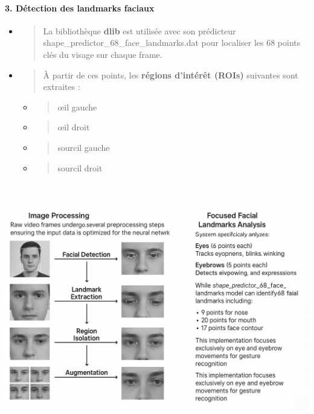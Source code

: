 \documentclass[
]{article}
\begin{document}
\hypertarget{duxe9tection-des-landmarks-faciaux}{%
\paragraph{\texorpdfstring{\textbf{3. Détection des landmarks faciaux}}{3. Détection des landmarks faciaux}}\label{duxe9tection-des-landmarks-faciaux}}

\begin{itemize}
\item
  \begin{quote}
  La bibliothèque \textbf{dlib} est utilisée avec son prédicteur shape\_predictor\_68\_face\_landmarks.dat pour localiser les 68 points clés du visage sur chaque frame.
  \end{quote}
\item
  \begin{quote}
  À partir de ces points, les \textbf{régions d'intérêt (ROIs)} suivantes sont extraites :
  \end{quote}

  \begin{itemize}
  \item
    \begin{quote}
    œil gauche
    \end{quote}
  \item
    \begin{quote}
    œil droit
    \end{quote}
  \item
    \begin{quote}
    sourcil gauche
    \end{quote}
  \item
    \begin{quote}
    sourcil droit
    \end{quote}
  \end{itemize}
\end{itemize}

\includegraphics[width=6.5in,height=4.33333in]{229856a5-a882-4d96-8360-24911cd95538_media/media/image3.png}
\end{document}
